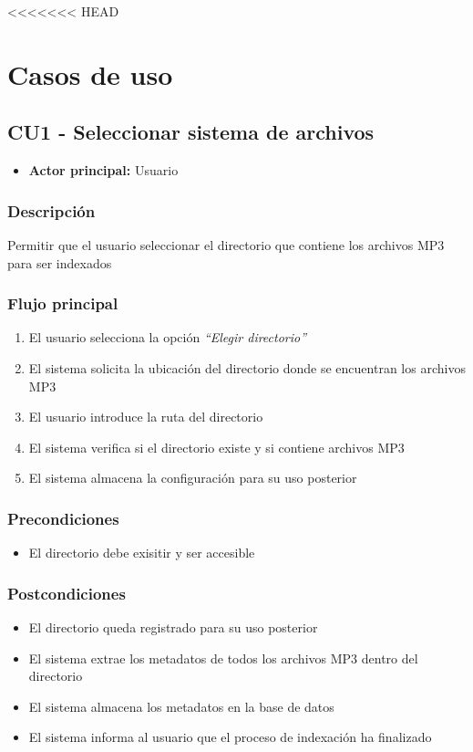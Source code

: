 <<<<<<< HEAD

\section*{Casos de uso}

\subsection*{CU1 - Seleccionar sistema de archivos}
\begin{itemize}
  \item \textbf{Actor principal:} Usuario
\end{itemize}

\subsubsection*{Descripción}
Permitir que el usuario seleccionar el directorio que contiene los archivos MP3 
para ser indexados

\subsubsection*{Flujo principal}
\begin{enumerate}
  \item El usuario selecciona la opción \textit{\textquotedblleft Elegir directorio\textquotedblright}
  \item El sistema solicita la ubicación del directorio donde se encuentran los
  archivos MP3
  \item El usuario introduce la ruta del directorio
  \item El sistema verifica si el directorio existe y si contiene archivos MP3
  \item El sistema almacena la configuración para su uso posterior
\end{enumerate}

\subsubsection*{Precondiciones}
\begin{itemize}
  \item El directorio debe exisitir y ser accesible
\end{itemize}

\subsubsection*{Postcondiciones}
\begin{itemize}
  \item El directorio queda registrado para su uso posterior
  \item El sistema extrae los metadatos de todos los archivos MP3 dentro del directorio
  \item El sistema almacena los metadatos en la base de datos
  \item El sistema informa al usuario que el proceso de indexación ha finalizado
\end{itemize}

